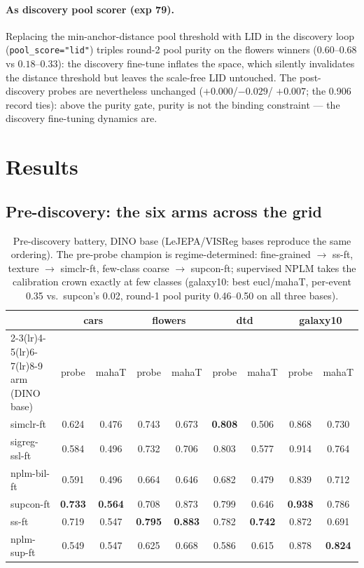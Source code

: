 \documentclass[11pt]{article}
\newcommand{\best}[1]{\textbf{#1}}
\begin{document}
\paragraph{As discovery pool scorer (exp 79).}
Replacing the min-anchor-distance pool threshold with LID in the
discovery loop (\texttt{pool\_score="lid"}) triples round-2 pool purity
on the flowers winners ($0.60$--$0.68$ vs $0.18$--$0.33$): the
discovery fine-tune inflates the space, which silently invalidates the
distance threshold but leaves the scale-free LID untouched.  The
post-discovery probes are nevertheless unchanged ($+0.000$/$-0.029$/
$+0.007$; the 0.906 record ties): above the purity gate, purity is not
the binding constraint --- the discovery fine-tuning dynamics are.

\section{Results}

\subsection{Pre-discovery: the six arms across the grid}

\begin{table}[h]\centering\small
\setlength{\tabcolsep}{4pt}
\begin{tabular}{l cc cc cc cc}
\toprule
& \multicolumn{2}{c}{cars} & \multicolumn{2}{c}{flowers}
& \multicolumn{2}{c}{dtd} & \multicolumn{2}{c}{galaxy10} \\
\cmidrule(lr){2-3}\cmidrule(lr){4-5}\cmidrule(lr){6-7}\cmidrule(lr){8-9}
arm (DINO base) & probe & mahaT & probe & mahaT & probe & mahaT & probe & mahaT \\
\midrule
simclr-ft      & 0.624 & 0.476 & 0.743 & 0.673 & \best{0.808} & 0.506 & 0.868 & 0.730 \\
sigreg-ssl-ft  & 0.584 & 0.496 & 0.732 & 0.706 & 0.803 & 0.577 & 0.914 & 0.764 \\
nplm-bil-ft    & 0.591 & 0.496 & 0.664 & 0.646 & 0.682 & 0.479 & 0.839 & 0.712 \\
supcon-ft      & \best{0.733} & \best{0.564} & 0.708 & 0.873 & 0.799 & 0.646 & \best{0.938} & 0.786 \\
ss-ft          & 0.719 & 0.547 & \best{0.795} & \best{0.883} & 0.782 & \best{0.742} & 0.872 & 0.691 \\
nplm-sup-ft    & 0.549 & 0.547 & 0.625 & 0.668 & 0.586 & 0.615 & 0.878 & \best{0.824} \\
\bottomrule
\end{tabular}
\caption{Pre-discovery battery, DINO base (LeJEPA/VISReg bases reproduce
the same ordering).  The pre-probe champion is regime-determined:
fine-grained $\to$ ss-ft, texture $\to$ simclr-ft, few-class coarse $\to$
supcon-ft; supervised NPLM takes the calibration crown exactly at few
classes (galaxy10: best eucl/mahaT, per-event 0.35 vs.\ supcon's 0.02,
round-1 pool purity 0.46--0.50 on all three bases).}
\end{table}
\end{document}
